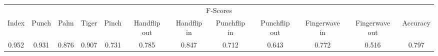 \documentclass{standalone}
\begin{document}
 
 \begin{tabular}{|c|c|c|c|c|c|c|c|c|c|c ||c|}
\cline{1-12}\multicolumn{12}{|c|}{F-Scores} \\ 
\cline{1-12}Index & Punch & Palm & Tiger & Pinch & Handflip out & Handflip in & Punchflip in & Punchflip out & Fingerwave in & Fingerwave out & Accuracy\\ 
\cline{1-12}0.952 & 0.931 & 0.876 & 0.907 & 0.731 & 0.785 & 0.847 & 0.712 & 0.643 & 0.772 & 0.516 & 0.797\\ 
 \cline{1-12}\hline \end{tabular}
 
\end{document}
